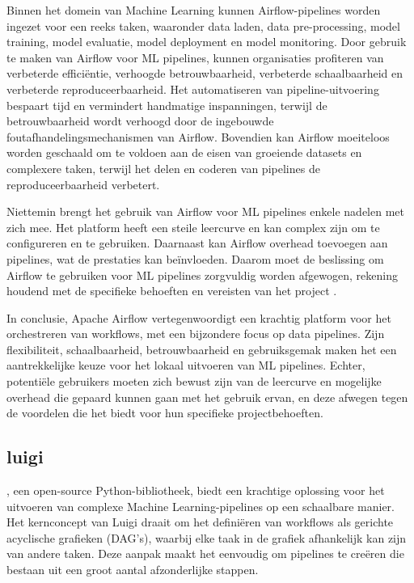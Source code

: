 Binnen het domein van Machine Learning kunnen Airflow-pipelines worden ingezet voor een reeks taken, waaronder data laden, data pre-processing, model training, model evaluatie, model deployment en model monitoring. Door gebruik te maken van Airflow voor ML pipelines, kunnen organisaties profiteren van verbeterde efficiëntie, verhoogde betrouwbaarheid, verbeterde schaalbaarheid en verbeterde reproduceerbaarheid. Het automatiseren van pipeline-uitvoering bespaart tijd en vermindert handmatige inspanningen, terwijl de betrouwbaarheid wordt verhoogd door de ingebouwde foutafhandelingsmechanismen van Airflow. Bovendien kan Airflow moeiteloos worden geschaald om te voldoen aan de eisen van groeiende datasets en complexere taken, terwijl het delen en coderen van pipelines de reproduceerbaarheid verbetert.

Niettemin brengt het gebruik van Airflow voor ML pipelines enkele nadelen met zich mee. Het platform heeft een steile leercurve en kan complex zijn om te configureren en te gebruiken. Daarnaast kan Airflow overhead toevoegen aan pipelines, wat de prestaties kan beïnvloeden. Daarom moet de beslissing om Airflow te gebruiken voor ML pipelines zorgvuldig worden afgewogen, rekening houdend met de specifieke behoeften en vereisten van het project \autocite{Harenslak2021}.

In conclusie, Apache Airflow vertegenwoordigt een krachtig platform voor het orchestreren van workflows, met een bijzondere focus op data pipelines. Zijn flexibiliteit, schaalbaarheid, betrouwbaarheid en gebruiksgemak maken het een aantrekkelijke keuze voor het lokaal uitvoeren van ML pipelines. Echter, potentiële gebruikers moeten zich bewust zijn van de leercurve en mogelijke overhead die gepaard kunnen gaan met het gebruik ervan, en deze afwegen tegen de voordelen die het biedt voor hun specifieke projectbehoeften.

\subsection{luigi}

\autocite{Luigi2024}, een open-source Python-bibliotheek, biedt een krachtige oplossing voor het uitvoeren van complexe Machine Learning-pipelines op een schaalbare manier. Het kernconcept van Luigi draait om het definiëren van workflows als gerichte acyclische grafieken (DAG's), waarbij elke taak in de grafiek afhankelijk kan zijn van andere taken. Deze aanpak maakt het eenvoudig om pipelines te creëren die bestaan uit een groot aantal afzonderlijke stappen.

